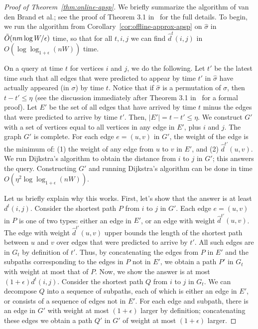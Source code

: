 \documentclass[11pt]{article}
\begin{document}
\begin{proof}[Proof of  Theorem~\ref{thm:online-apsp}]
We briefly summarize the algorithm of van den Brand et al.; see the proof of Theorem 3.1 in~\cite{BrandFNP24} for the full details.  
To begin, we run the algorithm from Corollary~\ref{cor:offline-approx-apsp} on $\hat{\sigma}$ in $\Tilde{O}(nm\log W / \epsilon)$ time, so that for all $t,i,j$ we can find $\hat{d}^t(i,j)$ in $O(\log \log_{1 + \epsilon} (nW))$ time.  

On a query at time $t$ for vertices $i$ and $j$, we do the following.  Let $t'$ be the latest time such that all edges that were predicted to appear by time $t'$ in $\hat{\sigma}$ have actually appeared (in $\sigma$) by time $t$.  Notice that if $\hat{\sigma}$ is a permutation of $\sigma$, then $t - t' \leq \eta$ (see the discussion immediately after Theorem 3.1 in~\cite{BrandFNP24} for a formal proof).  
Let $E'$ be the set of all edges that have arrived by time $t$ minus the edges that were predicted to arrive by time $t'$. Then, $|E'| = t - t' \leq \eta$. 
We construct $G'$ with a set of vertices equal to all vertices in any edge in $E'$, plus $i$ and $j$.  The graph $G'$ is complete.  For each edge $e = (u,v)$ in $G'$, the weight of the edge is the minimum of: (1) the weight of any edge from $u$ to $v$ in $E'$, and (2) $\hat{d}^{t'}(u,v)$.  We run Dijkstra's algorithm to obtain the distance from $i$ to $j$ in $G'$; this answers the query.  Constructing $G'$ and running Dijkstra's algorithm can be done in time $O(\eta^2 \log\log_{1 + \epsilon} (nW))$.

Let us briefly explain why this works.  
First, let's show that the answer is at least $d^t(i,j)$.  
Consider the shortest path $P$ from $i$ to $j$ in $G'$.  
Each edge $e = (u,v)$ in $P$ is one of two types: either an edge in $E'$, or an edge with weight $\hat{d}^{t'}(u,v)$.  The edge with weight $\hat{d}^{t'}(u,v)$ upper bounds the length of the shortest path between $u$ and $v$ over edges that were predicted to arrive by $t'$.  All such edges are in $G_t$ by definition of $t'$.  
Thus, by concatenating the edges from $P$ in $E'$ and the subpaths corresponding to the edges in $P$ not in $E'$, we obtain a path $P'$ in $G_t$ with weight at most that of $P$.
Now, we show the answer is at most $(1 + \epsilon)d^t(i,j)$.
Consider the shortest path $Q$ from $i$ to $j$ in $G_t$.  
We can decompose $Q$ into a sequence of subpaths, each of which is either an edge in $E'$, or consists of a sequence of edges not in $E'$.  For each edge and subpath, there is an edge in $G'$ with weight at most $(1+\epsilon)$ larger by definition; concatenating these edges we obtain a path $Q'$ in $G'$ of weight at most $(1 + \epsilon)$ larger.


\end{proof}
\end{document}
